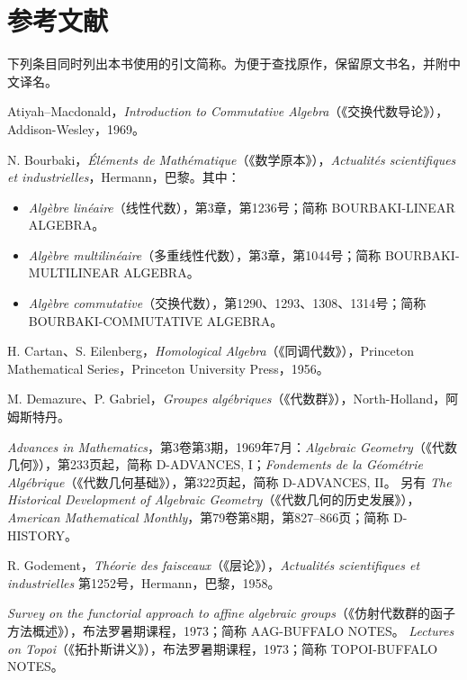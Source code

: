 \section*{参考文献}
下列条目同时列出本书使用的引文简称。为便于查找原作，保留原文书名，并附中文译名。
\begin{description}[style=nextline,leftmargin=1.5em]
\item[ATIYAH--MACDONALD]
Atiyah--Macdonald，\textit{Introduction to Commutative Algebra}（《交换代数导论》），Addison-Wesley，1969。
\item[BOURBAKI]
N. Bourbaki，\textit{Éléments de Mathématique}（《数学原本》），\textit{Actualités scientifiques et industrielles}，Hermann，巴黎。其中：
\begin{itemize}
\item \textit{Algèbre linéaire}（线性代数），第3章，第1236号；简称 BOURBAKI-LINEAR ALGEBRA。
\item \textit{Algèbre multilinéaire}（多重线性代数），第3章，第1044号；简称 BOURBAKI-MULTILINEAR ALGEBRA。
\item \textit{Algèbre commutative}（交换代数），第1290、1293、1308、1314号；简称 BOURBAKI-COMMUTATIVE ALGEBRA。
\end{itemize}
\item[CARTAN--EILENBERG]
H. Cartan、S. Eilenberg，\textit{Homological Algebra}（《同调代数》），Princeton Mathematical Series，Princeton University Press，1956。
\item[DEMAZURE--GABRIEL]
M. Demazure、P. Gabriel，\textit{Groupes algébriques}（《代数群》），North-Holland，阿姆斯特丹。
\item[DIEUDONNÉ]
\textit{Advances in Mathematics}，第3卷第3期，1969年7月：\textit{Algebraic Geometry}（《代数几何》），第233页起，简称 D-ADVANCES, I；\textit{Fondements de la Géométrie Algébrique}（《代数几何基础》），第322页起，简称 D-ADVANCES, II。
另有 \textit{The Historical Development of Algebraic Geometry}（《代数几何的历史发展》），\textit{American Mathematical Monthly}，第79卷第8期，第827--866页；简称 D-HISTORY。
\item[GODEMENT]
R. Godement，\textit{Théorie des faisceaux}（《层论》），\textit{Actualités scientifiques et industrielles} 第1252号，Hermann，巴黎，1958。
\item[GROTHENDIECK：布法罗讲义]
\textit{Survey on the functorial approach to affine algebraic groups}（《仿射代数群的函子方法概述》），布法罗暑期课程，1973；简称 AAG-BUFFALO NOTES。
\textit{Lectures on Topoi}（《拓扑斯讲义》），布法罗暑期课程，1973；简称 TOPOI-BUFFALO NOTES。

\end{description}
